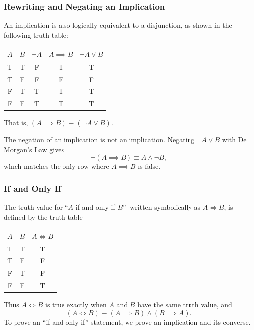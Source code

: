 \subsubsection{Rewriting and Negating an Implication}
An implication is also logically equivalent to a disjunction, as shown in the following truth table:
\begin{center}
\begin{tabular}{c|c|c|c|c}
$A$ & $B$ & $\neg A$ & $A \implies B$ & $\neg A \vee B$ \\
\hline
T & T & F & T & T \\
T & F & F & F & F \\
F & T & T & T & T \\
F & F & T & T & T
\end{tabular}
\end{center}
That is, $(A \implies B) \equiv (\neg A \vee B)$.

\begin{remark}
    The negation of an implication is not an implication. Negating $\neg A \vee B$ with De Morgan's Law
    gives
    \begin{equation*}
        \neg (A \implies B) \equiv A \wedge \neg B,
    \end{equation*}
    which matches the only row where $A \implies B$ is false.
\end{remark}

\subsubsection{If and Only If}
\begin{definition}
    The truth value for ``$A$ if and only if $B$'', written symbolically as $A \iff B$, is defined by the truth table

    \begin{center}
    \begin{tabular}{c|c|c}
    $A$ & $B$ & $A \iff B$ \\
    \hline
    T & T & T \\
    T & F & F \\
    F & T & F \\
    F & F & T
    \end{tabular}
    \end{center}

\end{definition}

Thus $A \iff B$ is true exactly when $A$ and $B$ have the same truth value, and
\begin{equation*}
    (A \iff B) \equiv (A \implies B) \wedge (B \implies A).
\end{equation*}
To prove an ``if and only if'' statement, we prove an implication and its converse.
